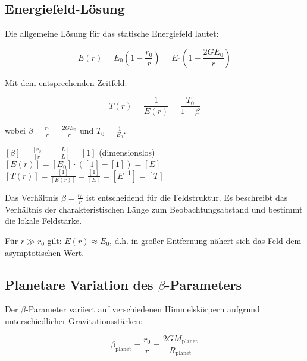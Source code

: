 \documentclass[12pt,a4paper]{article}
\theoremstyle{definition}
\begin{document}
	\subsection{Energiefeld-Lösung}
	
	Die allgemeine Lösung für das statische Energiefeld lautet:
	
	\begin{equation}
		\boxed{E(r) = E_0\left(1 - \frac{r_0}{r}\right) = E_0\left(1 - \frac{2GE_0}{r}\right)}
	\end{equation}
	
	Mit dem entsprechenden Zeitfeld:
	
	\begin{equation}
		T(r) = \frac{1}{E(r)} = \frac{T_0}{1 - \beta}
	\end{equation}
	
	wobei $\beta = \frac{r_0}{r} = \frac{2GE_0}{r}$ und $T_0 = \frac{1}{E_0}$.
	
	\begin{einheitencheck}
		$[\beta] = \frac{[r_0]}{[r]} = \frac{[L]}{[L]} = [1]$ (dimensionslos) \checkmark\\
		$[E(r)] = [E_0] \cdot ([1] - [1]) = [E]$ \checkmark\\
		$[T(r)] = \frac{[1]}{[E(r)]} = \frac{[1]}{[E]} = [E^{-1}] = [T]$ \checkmark
	\end{einheitencheck}
	
	\begin{verhaltnis}
		Das Verhältnis $\beta = \frac{r_0}{r}$ ist entscheidend für die Feldstruktur. Es beschreibt das Verhältnis der charakteristischen Länge zum Beobachtungsabstand und bestimmt die lokale Feldstärke.
		
		Für $r \gg r_0$ gilt: $E(r) \approx E_0$, d.h. in großer Entfernung nähert sich das Feld dem asymptotischen Wert.
	\end{verhaltnis}
	
	\subsection{Planetare Variation des $\beta$-Parameters}
	
	Der $\beta$-Parameter variiert auf verschiedenen Himmelskörpern aufgrund unterschiedlicher Gravitationsstärken:
	
	\begin{equation}
		\beta_{\text{planet}} = \frac{r_0}{r} = \frac{2GM_{\text{planet}}}{R_{\text{planet}}}
	\end{equation}
	
\end{document}
